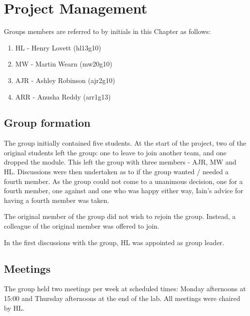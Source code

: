 
\chapter{Project Management}\label{ch:pm}


Groups members are referred to by initials in this Chapter as follows:
\begin{enumerate}
\item HL - Henry Lovett (hl13g10)
\item MW - Martin Wearn (mw20g10)
\item AJR - Ashley Robinson (ajr2g10)
\item ARR - Anusha Reddy (arr1g13)
\end{enumerate}

\section{Group formation}

The group initially contained five students. 
At the start of the project, two of the original students left the group: one to leave to join another team, and one dropped the module.
This left the group with three members - AJR, MW and HL. 
Discussions were then undertaken as to if the group wanted / needed a fourth member. 
As the group could not come to a unanimous decision, one for a fourth member, one against and one who was happy either way, Iain's advice for having a fourth member was taken. 

The original member of the group did not wish to rejoin the group.
Instead, a colleague of the original member was offered to join.

In the first discussions with the group, HL was appointed as group leader. 

\section{Meetings}

The group held two meetings per week at scheduled times: Monday afternoons at 15:00 and Thursday afternoons at the end of the lab.
All meetings were chaired by HL.

